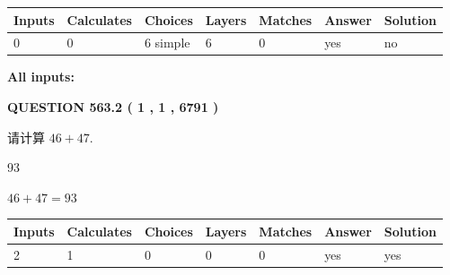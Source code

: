 \documentclass{ctexart}
\begin{document}
   
\noindent\begin{tabular}{|l|l|l|l|l|l|l|}
 \hline
Inputs & Calculates & Choices & Layers & Matches & Answer & Solution \\ \hline
 0  & 
 0  & 
 6
  simple  
  & 
 6  & 
 0  & 
  yes & 
  no 
  \\ \hline
 \end{tabular}
   
   
   
   
\noindent{}
   
   
   
   
\noindent\vspace{0.1in}\hspace{-0.08in} {\textbf{\Large{All inputs: }}}
   
   
  
\vspace{0.2in}
  
{\textbf{\Large{QUESTION
563.2 
 ( 1 , 1 , 6791 )
}}}
  
  
 
请计算 $ %
46 +  %
47 $.
 
 
 
\noindent{}
 
 

93
 
 
\noindent{}
 
 

 
 
 
\noindent{}
 
 

$ %
46 +  %
47=   %
93$
 
 
\noindent{}
 
 

 
   
   
   
   
\noindent\begin{tabular}{|l|l|l|l|l|l|l|}
 \hline
Inputs & Calculates & Choices & Layers & Matches & Answer & Solution \\ \hline
 2  & 
 1  & 
 0
  & 
 0  & 
 0  & 
  yes & 
  yes 
  \\ \hline
 \end{tabular}
   
\end{document}
